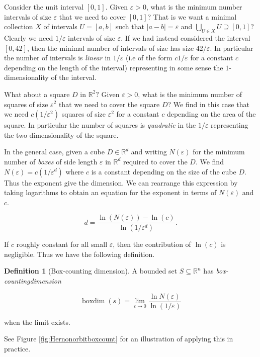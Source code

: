 \documentclass[
  a4paper,
  oneside,
  final]{krantz}
\newcommand{\R}{\mathbb{R}}
\renewcommand{\epsilon}{\varepsilon}
\newcommand{\bdim}{\mathop{\mathrm{boxdim}}}
\theoremstyle{definition}
\newtheorem{definition}{Definition}[chapter]
\theoremstyle{definition}
\theoremstyle{definition}
\theoremstyle{definition}
\theoremstyle{remark}
\begin{document}
Consider the unit interval \([0,1]\). Given \(\epsilon >0\), what is the minimum number intervals of size \(\epsilon\) that we need to cover \([0,1]\)? That is we want a minimal collection \(X\) of intervals \(U=[a,b]\) such that \(|a-b| = \epsilon\) and \(\bigcup_{U \in X} U \supseteq [0,1]\)? Clearly we need \(1/\epsilon\) intervals of size \(\epsilon\). If we had instead considered the interval \([0, 42]\), then the minimal number of intervals of size has size \(42/\epsilon\). In particular the number of intervals is \emph{linear} in \(1/\epsilon\) (i.e of the form \(c 1/\epsilon\) for a constant \(c\) depending on the length of the interval) representing in some sense the \(1\)-dimensionality of the interval.

What about a square \(D\) in \(\R^2?\) Given \(\epsilon >0\), what is the minimum number of squares of size \(\epsilon^2\) that we need to cover the square \(D\)? We find in this case that we need \(c(1/\epsilon^2)\) squares of size \(\epsilon^2\) for a constant \(c\) depending on the area of the square. In particular the number of squares is \emph{quadratic} in the \(1/\epsilon\) representing the two dimensionality of the square.

In the general case, given a cube \(D \in \R^{d}\) and writing \(N(\epsilon)\) for the minimum number of \emph{boxes} of side length \(\epsilon\) in \(\R^{d}\) required to cover the \(D\). We find \(N(\epsilon) = c(1/\epsilon^{d})\) where \(c\) is a constant depending on the size of the cube \(D\). Thus the exponent give the dimension. We can rearrange this expression by taking logarithms to obtain an equation for the exponent in terms of \(N(\epsilon)\) and \(c\).

\[ d =  \dfrac{\ln(N(\epsilon)) - \ln(c)}{\ln(1/\epsilon^{d})}.\]

If \(c\) roughly constant for all small \(\epsilon\), then the contribution of \(\ln(c)\) is negligible. Thus we have the following definition.

\begin{definition}[Box-counting dimension]
\protect\hypertarget{def:boxcountingdim}{}\label{def:boxcountingdim}A bounded set \(S \subseteq \R^{n}\) has \emph{box-countingdimension}

\[ \bdim(s) = \lim_{\epsilon \to 0} \dfrac{\ln N(\epsilon)}{\ln(1/\epsilon)} \]

when the limit exists.
\end{definition}

See Figure \ref{fig:Hernonorbitboxcount} for an illustration of applying this in practice.
\end{document}
